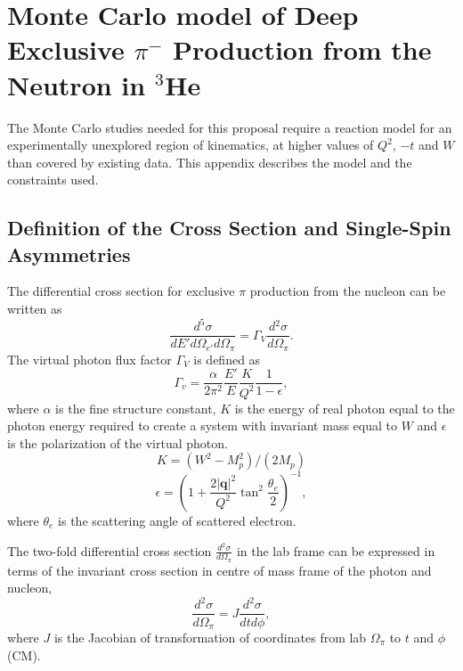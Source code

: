 \section{Monte Carlo model of Deep Exclusive $\pi^{-}$ Production from the
  Neutron in $^{3}$He }

The Monte Carlo studies needed for this proposal require a reaction
model for an experimentally unexplored region of kinematics, at higher
values of $Q^2$, $-t$ and $W$ than covered by existing data.  This appendix
describes the model and the constraints used.

\subsection{Definition of the Cross Section and Single-Spin Asymmetries}

The differential cross section for exclusive $\pi$ production from the nucleon
can be written as
\begin{equation}
  \frac{d^{5} \sigma}{dE' d\Omega_{e'} d\Omega_{\pi}} = \Gamma_{V} \frac{d{^2}
  \sigma}{d\Omega_{\pi}}.
\end{equation}
The virtual photon flux factor $\Gamma_{V}$ is defined as
\begin{equation}
  \Gamma_v=\frac{\alpha}{2\pi^2} \frac{E'}{E} \frac{K}{Q^2}\frac{1}{1-\epsilon},
\end{equation}
where $\alpha$ is the fine structure constant, $K$ is the energy of real photon
equal to the photon energy required to create a system with invariant mass
equal to $W$ and $\epsilon$ is the polarization of the virtual photon.
\begin{equation}
  K=(W^2-M_p^2)/(2 M_p)
\end{equation}
\begin{equation}
  \epsilon=\left(1+\frac{2 |\mathbf{q}|^2}{Q^2} \tan^2\frac{\theta_{e}}{2}
  \right)^{-1},
\end{equation}
where $\theta_{e}$ is the scattering angle of scattered electron.

The two-fold differential cross section $\frac{d{^2} \sigma}{d\Omega_{\pi}}$ in
the lab frame can be expressed in terms of the invariant cross section in
centre of mass frame of the photon and nucleon,
\begin{equation}
  \frac{d^2 \sigma}{d\Omega_\pi}= J \frac{d^2 \sigma}{dt d\phi},
\end{equation}
where $J$ is the Jacobian of transformation of coordinates from lab
$\Omega_{\pi}$ to $t$ and $\phi$ (CM). 

